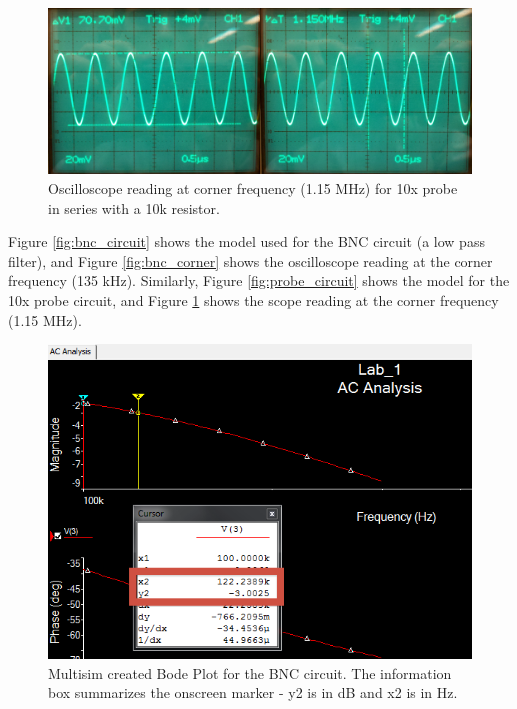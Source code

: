 \documentclass[12pt,letterpaper]{report}
\newlength \figwidth
\begin{document}
\begin{figure}
	\centering
	\includegraphics[width=\linewidth, keepaspectratio=true]{lab1_images/10x_sine_corner.png} 
	\caption{Oscilloscope reading at corner frequency (1.15 MHz) for 10x probe in series with a 10k resistor. }
	\label{fig:probe_corner}
\end{figure}

Figure \ref{fig:bnc_circuit} shows the model used for the BNC circuit (a low pass filter), and Figure \ref{fig:bnc_corner} shows the oscilloscope reading at the corner frequency (135 kHz). Similarly, Figure \ref{fig:probe_circuit} shows the model for the 10x probe circuit, and Figure \ref{fig:probe_corner} shows the scope reading at the corner frequency (1.15 MHz).

\begin{figure}
	\centering
	\includegraphics[width=\figwidth, keepaspectratio=true]{lab1_images/BNC_bode.png} 
	\caption{Multisim created Bode Plot for the BNC circuit. The information box summarizes the onscreen marker - y2 is in dB and x2 is in Hz. }
	\label{fig:bnc_bode}
\end{figure}
\end{document}
